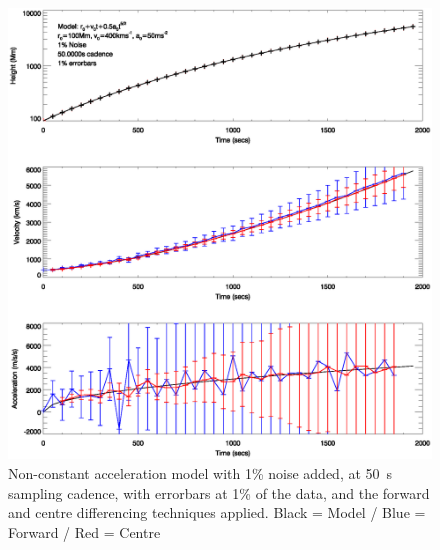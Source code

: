 \documentclass[namedreferences]{SolarPhysics}
\begin{document}
\begin{article}
\begin{figure}
 \centerline{\includegraphics[width=\linewidth]{images/nonconst_a_errorbars001_noise001_cadence50.ps}}
   \caption{Non-constant acceleration model with 1\% noise added, at 50~s sampling cadence, with errorbars at 1\% of the data, and the forward and centre differencing techniques applied. Black = Model / Blue = Forward / Red = Centre}
    \label{nonconst_a_errorbars001_noise001_cadence50}
\end{figure}


\end{article}
\end{document}
